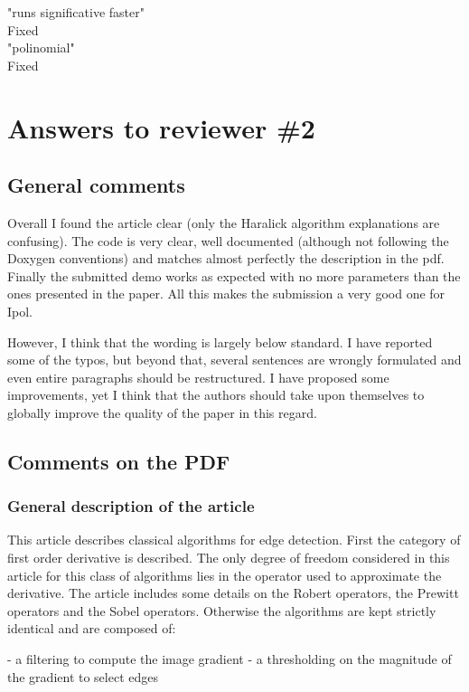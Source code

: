 \documentclass[a4paper,10pt]{report}
\begin{document}
\que "runs significative faster"\\

\ans Fixed\\

\que "polinomial"\\
\ans Fixed\\

\chapter{Answers to reviewer \#2}

\section{General comments}
Overall I found the article clear (only the Haralick algorithm explanations are
confusing). The code is very clear, well documented (although not following the Doxygen conventions) and matches almost perfectly
the description in the pdf. Finally the submitted demo works as expected with no
more parameters than the ones presented in the paper. All this makes the
submission a very good one for Ipol.

However, I think that the wording is largely below standard. I have reported
some of the typos, but beyond that, several sentences are wrongly formulated and
even entire paragraphs should be restructured. I have proposed some improvements, yet
I think that the authors should take upon themselves to globally improve the
quality of the paper in this regard.

\section{Comments on the PDF}
\subsection{General description of the article}
This article describes classical algorithms for edge detection. First the
category of first order derivative is described. The only degree of freedom
considered in this article for this class of algorithms lies in the operator
used to approximate the derivative. The article includes some details on the
Robert operators, the Prewitt operators and the Sobel operators. Otherwise the
algorithms are kept strictly identical and are composed of:

- a filtering to compute the image gradient
- a thresholding on the magnitude of the gradient to select edges
\end{document}
